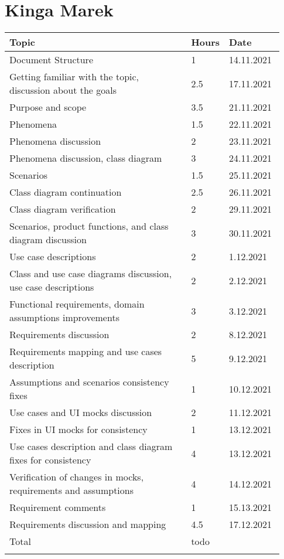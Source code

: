 \section*{Kinga Marek}
\begin{longtable}{@{}p{0.67\linewidth} p{0.06\linewidth} p{0.20\linewidth}@{}}
    \Xhline{1.5pt}
    Topic &  Hours & Date \\ \hline
    Document Structure & 1 & 14.11.2021 \\ 
    Getting familiar with the topic, discussion about the goals & 2.5 & 17.11.2021 \\ 
    Purpose and scope & 3.5 & 21.11.2021 \\
    Phenomena & 1.5 & 22.11.2021 \\ 
    Phenomena discussion & 2 & 23.11.2021 \\
    Phenomena discussion, class diagram & 3 & 24.11.2021 \\ 
    Scenarios & 1.5 & 25.11.2021 \\ 
    Class diagram continuation & 2.5 & 26.11.2021 \\
    Class diagram verification & 2 & 29.11.2021 \\
    Scenarios, product functions, and class diagram discussion & 3 & 30.11.2021\\ 
    Use case descriptions & 2 & 1.12.2021\\
    Class and use case diagrams discussion, use case descriptions & 2 & 2.12.2021\\
    Functional requirements, domain assumptions improvements & 3 & 3.12.2021\\
    Requirements discussion & 2 & 8.12.2021\\
    Requirements mapping and use cases description & 5 & 9.12.2021\\
    Assumptions and scenarios consistency fixes & 1 & 10.12.2021\\
    Use cases and UI mocks discussion & 2 & 11.12.2021\\
    Fixes in UI mocks for consistency & 1 & 13.12.2021\\
    Use cases description and class diagram fixes for consistency & 4 & 13.12.2021\\
    Verification of changes in mocks, requirements and assumptions & 4 & 14.12.2021\\
    Requirement comments & 1 & 15.13.2021 \\
    Requirements discussion and mapping & 4.5 & 17.12.2021\\
    \hline
    Total & todo & \\ \Xhline{1.5pt}
\end{longtable}